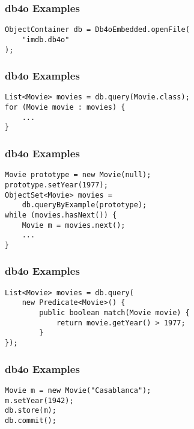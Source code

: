 \documentclass[dvipsnames]{beamer}
\theoremstyle{plain}
\begin{document}
\begin{frame}[fragile]
  \frametitle{db4o Examples}

  \begin{example}
    \begin{lstlisting}
ObjectContainer db = Db4oEmbedded.openFile(
    "imdb.db4o"
);
    \end{lstlisting}
  \end{example}
\end{frame}

\begin{frame}[fragile]
  \frametitle{db4o Examples}

  \begin{example}
    \begin{lstlisting}
List<Movie> movies = db.query(Movie.class);
for (Movie movie : movies) {
    ...
}
    \end{lstlisting}
  \end{example}
\end{frame}

\begin{frame}[fragile]
  \frametitle{db4o Examples}

  \begin{example}
    \begin{lstlisting}
Movie prototype = new Movie(null);
prototype.setYear(1977);
ObjectSet<Movie> movies =
    db.queryByExample(prototype);
while (movies.hasNext()) {
    Movie m = movies.next();
    ...
}
    \end{lstlisting}
  \end{example}
\end{frame}

\begin{frame}[fragile]
  \frametitle{db4o Examples}

  \begin{example}
    \begin{lstlisting}
List<Movie> movies = db.query(
    new Predicate<Movie>() {
        public boolean match(Movie movie) {
            return movie.getYear() > 1977;
        }
});
    \end{lstlisting}
  \end{example}
\end{frame}

\begin{frame}[fragile]
  \frametitle{db4o Examples}

  \begin{example}[insert]
    \begin{lstlisting}
Movie m = new Movie("Casablanca");
m.setYear(1942);
db.store(m);
db.commit();
    \end{lstlisting}
  \end{example}
\end{frame}
\end{document}
